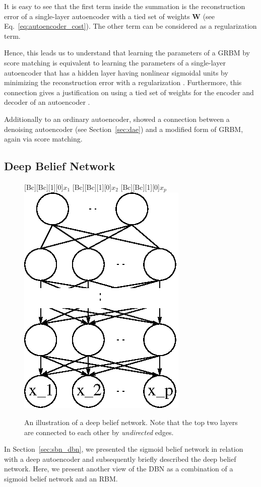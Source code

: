 \documentclass[dissertation,nocontribution,draft*]{aaltoseries}
\newcommand{\matr}[1]{\mathbf{#1}}
\newcommand{\mW}[0]{\matr{W}}
\begin{document}
It is easy to see that the first term inside the summation
is the reconstruction error of a single-layer autoencoder
with a tied set of weights $\mW$ (see
Eq.~\eqref{eq:autoencoder_cost}). The other term can be
considered as a regularization term.

Hence, this leads us to understand that learning the
parameters of a GRBM by score matching is equivalent to
learning the parameters of a single-layer autoencoder that
has a hidden layer having nonlinear sigmoidal units by
minimizing the reconstruction error with a regularization
\citep{Swersky2011}. Furthermore, this connection gives a
justification on using a tied set of weights for the
encoder and decoder of an autoencoder \citep{Vincent2011}.

Additionally to an ordinary autoencoder, \citet{Vincent2011}
showed a connection between a denoising autoencoder (see
Section~\ref{sec:dae}) and a modified form of GRBM, again
via score matching. 


\clearpage
\subsection{Deep Belief Network}
\label{sec:dbn}

\begin{figure}
    \centering
    [Bc][Bc][1][0]{$x_1$}
    [Bc][Bc][1][0]{$x_2$}
    [Bc][Bc][1][0]{$x_p$}
    \includegraphics[width=0.27\columnwidth]{figures/dbn.eps}
    \caption{An illustration of a deep belief network. Note
    that the top two layers are connected to each other by
    \textit{undirected} edges.}
    \label{fig:dbn}
    \vspace{-2mm}
\end{figure}

In Section~\ref{sec:sbn_dbn}, we presented the sigmoid
belief network in relation with a deep autoencoder and
subsequently briefly described the deep belief network.
Here, we present another view of the DBN as a combination of
a sigmoid belief network and an RBM.
\end{document}
